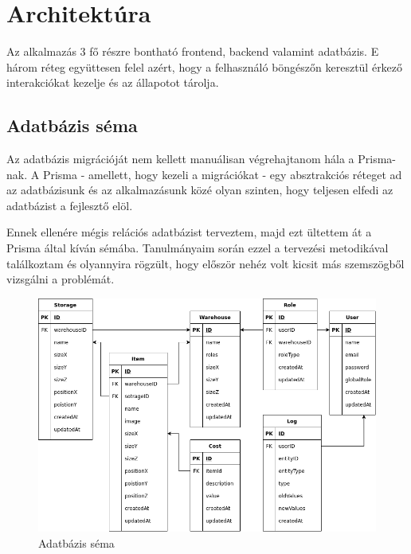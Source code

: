 \chapter{Architektúra}
Az alkalmazás 3 fő részre bontható frontend, backend valamint adatbázis.
E három réteg együttesen felel azért, hogy a felhasználó böngészőn keresztül érkező interakciókat kezelje és az állapotot tárolja.

\section{Adatbázis séma}
Az adatbázis migrációját nem kellett manuálisan végrehajtanom hála a Prisma-nak. 
A Prisma - amellett, hogy kezeli a migrációkat - egy absztrakciós réteget ad az adatbázisunk és az alkalmazásunk közé olyan szinten, hogy teljesen elfedi az adatbázist a fejlesztő elöl.

Ennek ellenére mégis relációs adatbázist terveztem, majd ezt ültettem át a Prisma által kíván sémába.
Tanulmányaim során ezzel a tervezési metodikával találkoztam és olyannyira rögzült, hogy először nehéz volt kicsit más szemszögből vizsgálni a problémát.

\begin{figure}[!ht]
  \centering
  \includegraphics[width=150mm, keepaspectratio]{figures/db.png}
  \caption{Adatbázis séma}
  \label{fig:db}
\end{figure}

